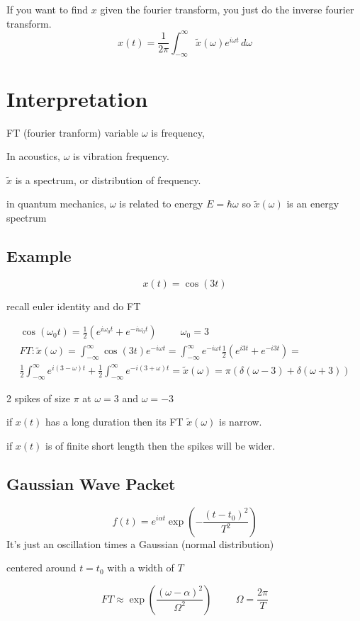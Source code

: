 \documentclass[fleqn]{report}
\newcommand{\hp}{\hspace{1cm}}
\newcommand{\equations} [1] {
\begin{gather*}
#1
\end{gather*}
}
\begin{document}
If you want to find $x$ given the fourier transform, you 
just do the inverse fourier transform. 
\[
x(t) = \frac{1}{2 \pi} \int^{\infty}_{- \infty} 
\tilde x(\omega) e^{i \omega t} \, d \omega 
\]

\section{Interpretation}
FT (fourier tranform) variable $\omega$ is frequency, 

In acoustics, $\omega$ is vibration frequency. 

$\tilde x$ is a spectrum, or distribution of frequency. 

in quantum mechanics, $\omega$ is related to energy $E = \hbar \omega$ so $\tilde x(\omega)$ is an energy spectrum 

\subsection{Example}
\[
x(t) = \cos(3 t)
\]

recall euler identity and do FT 
\equations{
    \cos(\omega_0 t) = 
    \frac{1}{2} (e^{i \omega_0 t} + e^{-i \omega_0 t})
    \hp 
    \omega_0 = 3
    \\
    FT: \tilde x(\omega) =
    \int^{\infty}_{-\infty} \cos(3t) e^{-i \omega t}
    =
    \int^{\infty}_{-\infty} e^{-i \omega t}
    \frac{1}{2} (e^{i 3 t} + e^{-i 3 t})
    =
    \\
    \frac{1}{2} \int^{\infty}_{-\infty} e^{i (3 - \omega) t}
    +
    \frac{1}{2} \int^{\infty}_{-\infty} e^{-i (3 + \omega) t}
    =
    \tilde x(\omega)
    =
    \pi (\delta(\omega - 3) + \delta(\omega + 3))
}
2 spikes of size $\pi$ at $\omega = 3$ and $\omega = -3$

if $x(t)$ has a long duration then 
its FT $\tilde x(\omega)$ is narrow.

if $x(t)$ is of finite short length then the spikes will be 
wider. 

\subsection{Gaussian Wave Packet}
\[
f(t) = e^{i \alpha t} \exp(- \frac{(t - t_0)^2}{T^2})
\]
It's just an oscillation times a Gaussian (normal distribution)

centered around $t = t_0$ with a width of $T$ 

\[
FT \approx \exp(\frac{(\omega - \alpha)^2}{\Omega^2})
\hp 
\Omega = \frac{2 \pi}{T}
\]
\end{document}
